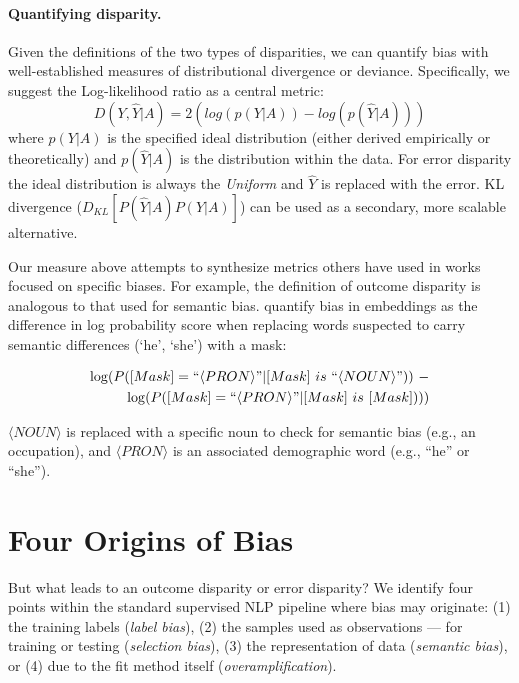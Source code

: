 \documentclass[11pt,a4paper]{article}
\begin{document}
\paragraph*{Quantifying disparity.}
Given the definitions of the two types of disparities, we can quantify bias with well-established measures of distributional divergence or deviance. Specifically, we suggest the Log-likelihood ratio as a central metric:
$$D(Y, \hat{Y}| A) = 2(log(p(Y|A)) - log(p(\hat{Y}|A))) $$
where $p(Y|A)$ is the specified ideal distribution (either derived empirically or theoretically) and $p(\hat{Y}|A)$ is the distribution within the data. For error disparity the ideal distribution is always the \textit{Uniform} and $\hat{Y}$ is replaced with the error.  KL divergence ($D_{KL}[P(\hat{Y}|A) P(Y|A)]$) can be used as a secondary, more scalable alternative. 

Our measure above attempts to synthesize metrics others have used in works focused on specific biases. 
For example, the definition of outcome disparity is analogous to that used for semantic bias.   quantify bias in embeddings as the difference in log probability score when replacing words suspected to carry semantic differences (`he', `she') with a mask: 

\begin{small}
\begin{equation}
\begin{aligned}
\log(P([Mask] = ``\langle PRON\rangle " | 
[Mask]\ is\ ``\langle NOUN\rangle"))\ -\\
\log(P([Mask] = ``\langle PRON\rangle" | 
[Mask]\ is\ [Mask]))) \nonumber
\end{aligned}
\end{equation}
\end{small}
$\langle NOUN\rangle$ is replaced with a specific noun to check for semantic bias (e.g., an occupation), and $\langle PRON\rangle$ is an associated demographic word (e.g., ``he'' or ``she''). 




\section{Four Origins of Bias}
But what leads to an outcome disparity or error disparity? We identify four points within the standard supervised NLP pipeline where bias may originate: (1) the training labels (\textit{label bias}), (2) the samples used as observations --- for training or testing (\textit{selection bias}), (3) the representation of data (\textit{semantic bias}), or (4) due to the fit method itself (\textit{overamplification}). 
\end{document}
